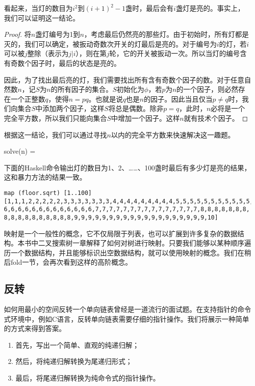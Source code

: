 \documentclass[UTF8]{article}
\begin{document}
看起来，当灯的数目为$i^2$到$(i+1)^2-1$盏时，最后会有$i$盏灯是亮的。事实上，我们可以证明这一结论。

\begin{proof}
将$n$盏灯编号为1到$n$，考虑最后仍然亮的那些灯。由于初始时，所有灯都是灭的，我们可以确定，被扳动奇数次开关的灯最后是亮的。对于编号为$i$的灯，若$i$可以被$j$整除（表示为$j | i$），则在第$j$轮，它的开关被扳动一次。所以当灯的编号含有奇数个因子时，最后的状态是亮的。

因此，为了找出最后亮的灯，我们需要找出所有含有奇数个因子的数。对于任意自然数$n$，记$S$为$n$的所有因子的集合。$S$初始化为$\phi$，若$p$为$n$的一个因子，则必然存在一个正整数$q$，使得$n = p q$。也就是说$q$也是$n$的因子。因此当且仅当$p \neq q$时，我们向集合$S$中添加两个因子，这样$S$将总是偶数。除非$p = q$，此时，$n$必将是一个完全平方数，所以我们只能向集合$S$中增加一个因子。这样$n$就有技术个因子。
\end{proof}

根据这一结论，我们可以通过寻找$n$以内的完全平方数来快速解决这一趣题。

\be
solve(n) = \lfloor {} \rfloor
\ee

下面的Haskell命令输出灯的数目为1、2、……、100盏时最后有多少灯是亮的结果，这和暴力方法的结果一致。

\begin{lstlisting}
map (floor.sqrt) [1..100]
[1,1,1,2,2,2,2,2,3,3,3,3,3,3,3,4,4,4,4,4,4,4,4,4,5,5,5,5,5,5,5,5,5,5,5,
6,6,6,6,6,6,6,6,6,6,6,6,6,7,7,7,7,7,7,7,7,7,7,7,7,7,7,7,8,8,8,8,8,8,8,
8,8,8,8,8,8,8,8,8,8,9,9,9,9,9,9,9,9,9,9,9,9,9,9,9,9,9,9,9,10]
\end{lstlisting}

映射是一个一般性的概念，它不仅局限于列表，也可以扩展到许多复杂的数据结构。本书中二叉搜索树一章解释了如何对树进行映射。只要我们能够以某种顺序遍历一个数据结构，并且能够标识出空数据结构，就可以使用映射的概念。我们在稍后fold一节，会再次看到这样的高阶概念。

\subsection{反转}

如何用最小的空间反转一个单向链表曾经是一道流行的面试题。在支持指针的命令式环境中，例如C语言，反转单向链表需要仔细的指针操作。我们将展示一种简单的方式来得到答案。

\begin{enumerate}
\item 首先，写出一个简单、直观的纯递归解；
\item 然后，将纯递归解转换为尾递归形式；
\item 最后，将尾递归解转换为纯命令式的指针操作。
\end{enumerate}
\end{document}
